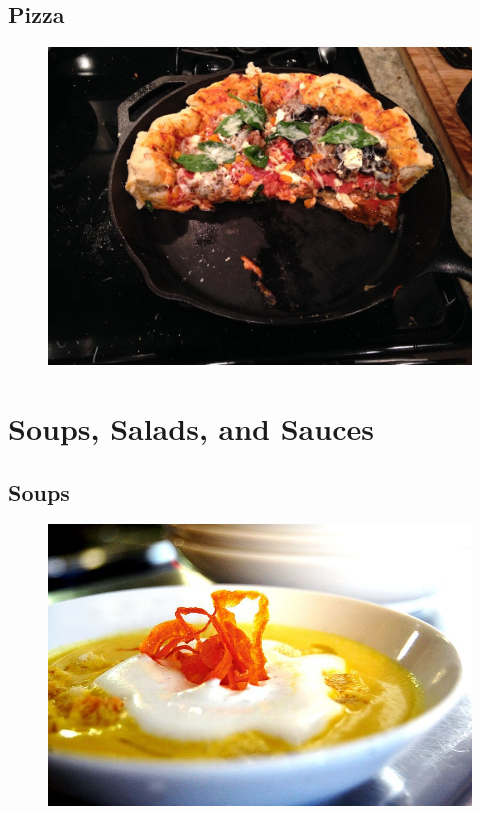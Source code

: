 \documentclass[11pt]{report}
\begin{document}
\chapter{Pizza}
\begin{figure}[h]
\begin{center}
   \includegraphics[width=\linewidth]{images/IMG_1083.JPG}
\end{center}
\end{figure}
\newpage



\part{Soups, Salads, and Sauces}

\chapter{Soups}
\begin{figure}[h]
\begin{center}
   \includegraphics[width=0.9\linewidth]{images/800px-Butternut_squash_soup.jpg}
\end{center}
\end{figure}
\newpage



\end{document}
